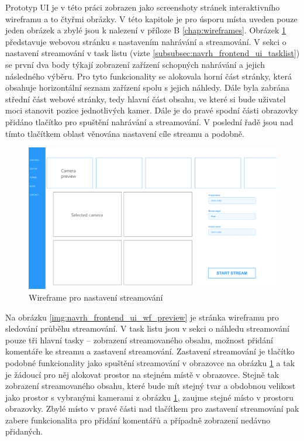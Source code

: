 \documentclass[thesis=M,czech]{FITthesis}[2012/06/26]
\begin{document}
	Prototyp UI je v této práci zobrazen jako screenshoty stránek interaktivního wireframu a to čtyřmi obrázky. V této kapitole je pro úsporu místa uveden pouze jeden obrázek a zbylé jsou k nalezení v příloze B \ref{chap:wireframes}. Obrázek \ref{img:navrh_frontend_ui_wf_config} představuje webovou stránku s nastavením nahrávání a streamování. V sekci o nastavení streamování v task listu (vizte \ref{subsubsec:navrh_frontend_ui_tasklist}) se první dva body týkají zobrazení zařízení schopných nahrávání a jejich následného výběru. Pro tyto funkcionality se alokovala horní část stránky, která obsahuje horizontální seznam zařízení spolu s jejich náhledy. Dále byla zabrána střední část webové stránky, tedy hlavní část obsahu, ve které si bude uživatel moci stanovit pozice jednotlivých kamer. Dále je do pravé spodní části obrazovky přidáno tlačítko pro spuštění nahrávání a streamování. V poslední řadě jsou nad tímto tlačítkem oblast věnována nastavení cíle streamu a podobně.
\\
\begin{figure}[h]\centering
	\includegraphics[width=1\textwidth]{images/ui_wf_ulab-config.eps}
	\caption{Wireframe pro nastavení streamování}\label{img:navrh_frontend_ui_wf_config}
\end{figure}

Na obrázku \ref{img:navrh_frontend_ui_wf_preview} je stránka wireframu pro sledování průběhu streamování. V task listu jsou v sekci o náhledu streamování pouze tři hlavní tasky -- zobrazení streamovaného obsahu, možnost přidání komentáře ke streamu a zastavení streamování. Zastavení streamování je tlačítko podobné funkcionality jako spuštění streamování v obrazovce na obrázku  \ref{img:navrh_frontend_ui_wf_config} a tak je žádoucí pro něj alokovat prostor na stejném místě v obrazovce. Stejně tak zobrazení streamovaného obsahu, které bude mít stejný tvar a obdobnou velikost jako prostor s vybranými kamerami z obrázku \ref{img:navrh_frontend_ui_wf_config}, zaujme stejné místo v prostoru obrazovky. Zbylé místo v pravé části nad tlačítkem pro zastavení streamování pak zabere funkcionalita pro přidání komentářů a případně zobrazení nedávno přidaných. 
\end{document}
